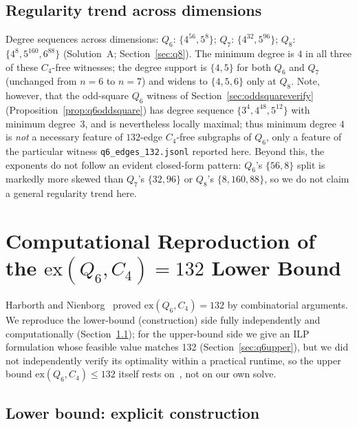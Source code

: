 \documentclass[12pt]{article}
\newcommand{\ex}{\mathrm{ex}}
\begin{document}
\subsection{Regularity trend across dimensions}\label{sec:regularity}

Degree sequences across dimensions: $Q_6$: $\{4^{56},5^{8}\}$;
$Q_7$: $\{4^{32},5^{96}\}$; $Q_8$: $\{4^8,5^{160},6^{88}\}$ (Solution~A;
Section~\ref{sec:q8}). The minimum degree is $4$ in all three of these
$C_4$-free witnesses; the
degree support is $\{4,5\}$ for both $Q_6$ and $Q_7$ (unchanged from
$n=6$ to $n=7$) and widens to $\{4,5,6\}$ only at $Q_8$. Note, however,
that the odd-square $Q_6$ witness of
Section~\ref{sec:oddsquareverify} (Proposition~\ref{prop:q6oddsquare})
has degree sequence $\{3^4,4^{48},5^{12}\}$ with minimum degree~$3$,
and is nevertheless locally maximal; thus minimum degree $4$ is
\emph{not} a necessary feature of $132$-edge $C_4$-free subgraphs of
$Q_6$, only a feature of the particular witness
\texttt{q6\_edges\_132.jsonl} reported here. Beyond this, the
exponents do not follow an evident closed-form pattern: $Q_6$'s
$\{56,8\}$ split is markedly more skewed than $Q_7$'s $\{32,96\}$ or
$Q_8$'s $\{8,160,88\}$, so we do not claim a general regularity trend
here.

\section{Computational Reproduction of the \texorpdfstring{$\ex(Q_6,C_4)=132$}{ex(Q6,C4)=132} Lower Bound}\label{sec:q6}

Harborth and Nienborg~\cite{HN94} proved $\ex(Q_6,C_4)=132$ by combinatorial
arguments. We reproduce the lower-bound (construction) side fully
independently and computationally (Section~\ref{sec:q6lower}); for the
upper-bound side we give an ILP formulation whose feasible value matches
132 (Section~\ref{sec:q6upper}), but we did not independently verify
its optimality within a practical runtime, so the upper bound
$\ex(Q_6,C_4)\le132$ itself rests on~\cite{HN94}, not on our own solve.

\subsection{Lower bound: explicit construction}\label{sec:q6lower}
\end{document}
